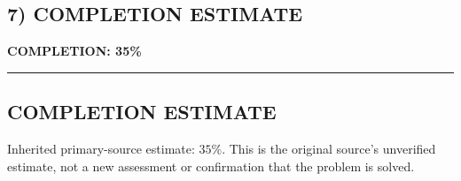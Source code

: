 \subsection*{7) COMPLETION ESTIMATE}
\noindent\textbf{COMPLETION: 35\%}

\hrule



\subsection*{COMPLETION ESTIMATE}
Inherited primary-source estimate: $35\%$. This is the original source's unverified estimate, not a new assessment or confirmation that the problem is solved.
